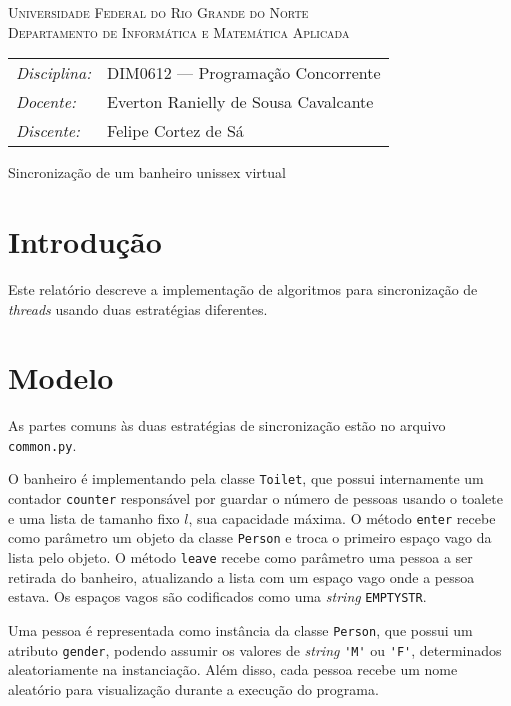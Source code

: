 \documentclass[12pt, a4paper]{article}
\newcommand{\code}[1]{{\lstinline{#1}}}
\begin{document}
\begin{center}
    \textsc{Universidade Federal do Rio Grande do Norte} \\
    \textsc{Departamento de Informática e Matemática Aplicada}
\end{center}

\bigskip

\begin{tabular}{@{}ll@{}}
    \emph{Disciplina:} & DIM0612 --- Programação Concorrente \\
    \emph{Docente:}    & Everton Ranielly de Sousa Cavalcante \\
    \emph{Discente:}   & Felipe Cortez de Sá \\
\end{tabular}

\bigskip

\begin{center}
\large Sincronização de um banheiro unissex virtual
\end{center}

\section{Introdução}
Este relatório descreve a implementação de algoritmos para sincronização de
\emph{threads} usando duas estratégias diferentes.

\section{Modelo}
As partes comuns às duas estratégias de sincronização estão no arquivo
\code{common.py}.

O banheiro é implementando pela classe \code{Toilet}, que possui internamente
um contador \code{counter} responsável por guardar o número de pessoas usando o
toalete e uma lista de tamanho fixo $ l $, sua capacidade máxima. O método
\code{enter} recebe como parâmetro um objeto da classe \code{Person} e troca o
primeiro espaço vago da lista pelo objeto. O método \code{leave} recebe como
parâmetro uma pessoa a ser retirada do banheiro, atualizando a lista com um
espaço vago onde a pessoa estava. Os espaços vagos são codificados como uma
\emph{string} \code{EMPTYSTR}.

Uma pessoa é representada como instância da classe \code{Person}, que possui um
atributo \code{gender}, podendo assumir os valores de \emph{string} \code{'M'}
ou \code{'F'}, determinados aleatoriamente na instanciação. Além disso, cada
pessoa recebe um nome aleatório para visualização durante a execução do
programa.
\end{document}
